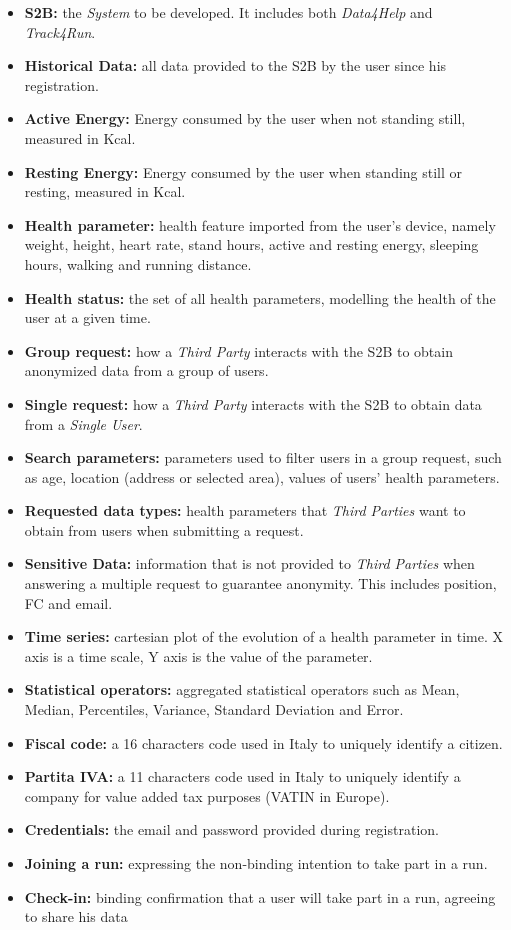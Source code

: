 \documentclass[titlepage]{article}
\begin{document}
			\begin{itemize}
				\item {\bf S2B: } the {\it System} to be developed. It includes both {\it Data4Help} and {\it Track4Run}.
				 \item {\bf Historical Data:} all data provided to the S2B by the user since his registration.
				\item{\bf Active Energy:} Energy consumed by the user when not standing still, measured in Kcal.
				\item{\bf Resting Energy:} Energy consumed by the user when standing still or resting, measured in Kcal.
				\item{\bf Health parameter: } health feature imported from the user’s device, namely weight, height, heart rate, stand hours, active and resting energy, sleeping hours, walking and running distance.
				\item{\bf Health status: } the set of all health parameters, modelling the health of the user at a given time.
				\item{\bf  Group request:} how a {\it Third Party} interacts with the S2B to obtain anonymized data from a group of users.
				\item{\bf Single request: } how a {\it Third Party} interacts with the S2B to obtain data from a {\it Single User}.
				\item{\bf Search parameters:} parameters used to filter users in a group request, such as age, location (address or selected area), values of users’ health parameters.
				\item{\bf Requested data types: } health parameters that {\it Third Parties} want to obtain from users when submitting a request.
				\item{\bf Sensitive Data:  } information that is not provided to {\it Third Parties} when answering a multiple request to guarantee anonymity. This includes position, FC and email.				
				\item{\bf Time series: } cartesian plot of the evolution of a health parameter in time. X axis is a time scale, Y axis is the value of the parameter.
				\item{\bf Statistical operators:} aggregated statistical operators such as Mean, Median, Percentiles, Variance, Standard Deviation and Error.		
				\item{\bf Fiscal code: } a 16 characters code used in Italy to uniquely identify a citizen.
				\item{\bf Partita IVA: } a 11 characters code used in Italy to uniquely identify a company for value added tax purposes (VATIN in Europe).
				\item{\bf Credentials: } the email and password provided during registration.
				\item{\bf Joining a run: } expressing the non-binding intention to take part in a run.
				\item{\bf Check-in: } binding confirmation that a user will take part in a run, agreeing to share his data			\end{itemize}
				
\end{document}
